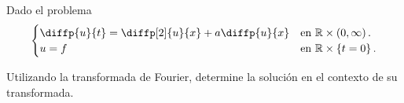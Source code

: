 Dado el problema
\begin{equation*}
	\begin{cases}\displaystyle
		\diffp{u}{t}=
		\diffp[2]{u}{x}+
		a\diffp{u}{x} &
		\text{en }\mathbb{R}\times\left(0,\infty\right). \\
		u=f           &
		\text{en }\mathbb{R}\times\left\{t=0\right\}.
	\end{cases}
\end{equation*}

\begin{center}
	
\end{center}

Utilizando la transformada de Fourier, determine la solución en el
contexto de su transformada.

\begin{solutionordottedlines}
\end{solutionordottedlines}
